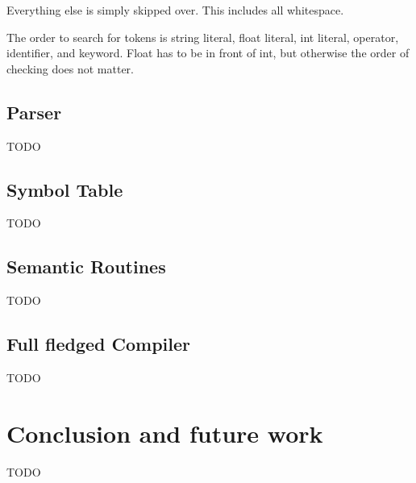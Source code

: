 \documentclass[12pt]{article}
\begin{document}
                Everything else is simply skipped over. This includes all whitespace.

                The order to search for tokens is string literal, float literal, int literal, operator, identifier, and keyword. Float has to be in front of int, but otherwise the order of checking does not matter.




    	\subsection{Parser}
    		TODO

    	\subsection{Symbol Table}
    		TODO

    	\subsection{Semantic Routines}
    		TODO

    	\subsection{Full fledged Compiler}
    		TODO

    \section{Conclusion and future work}	
			TODO	    
    
 
\end{document}
